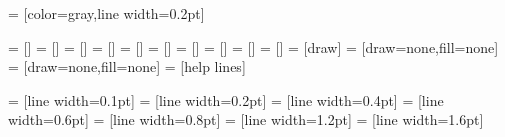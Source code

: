 \def\tikz@style@parseC#1[#2]#3=#4{%
  \pgfkeys{/tikz/#1/.default={#2}}%
  \pgfutil@in@+{#3}%
  \ifpgfutil@in@%
    \pgfkeys{/tikz/#1/.append style={#4}}%
  \else%
    \pgfkeys{/tikz/#1/.style={#4}}%
  \fi}
\def\tikz@style@parseD#1#2=#3{%
  \pgfutil@in@+{#2}%
  \ifpgfutil@in@%
    \pgfkeys{/tikz/#1/.append style={#3}}%
  \else%
    \pgfkeys{/tikz/#1/.style={#3}}%
  \fi}


%
%
%
%

=              [color=gray,line width=0.2pt]

=           []
=              []
=             []
=              []
=              []
=             []
=        []
=                []
=              []
=            []
=              [draw]
=             [draw=none,fill=none]
=               [draw=none,fill=none]
=          [help lines]

=              [line width=0.1pt]
=               [line width=0.2pt]
=                    [line width=0.4pt]
=               [line width=0.6pt]
=                   [line width=0.8pt]
=              [line width=1.2pt]
=             [line width=1.6pt]

